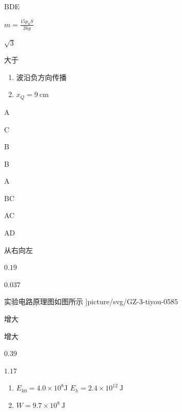 \item BDE
\item $m=\frac {15 p_{0} S}{26 g}$
\item $\sqrt {3}$
\item 大于
\item \begin {enumerate} \renewcommand {\labelenumi }{\arabic {enumi}.} \item 波沿负方向传播 \item $x_{Q}=9\ \mathrm {cm}$ \par \end {enumerate} \par \par 
\item A
\item C
\item B
\item B
\item A
\item BC
\item AC
\item \par 
\item AD
\item \par 
\item 从右向左
\item $ 0.19 $
\item $ 0.037 $
\item 实验电路原理图如图所示 \linewidth ]{picture/svg/GZ-3-tiyou-0585}
\item 增大
\item 增大
\item $ 0.39 $
\item $ 1.17 $
\item \par 
\item \begin {enumerate} \renewcommand {\labelenumi }{\arabic {enumi}.} \item $E_{k 0}=4.0 \times 10^{8} \mathrm {J}$ \quad $E_{h}=2.4 \times 10^{12} \ \mathrm {J}$ \item $W=9.7 \times 10^{8} \ \mathrm {J}$ \par \end {enumerate} \par \par 
